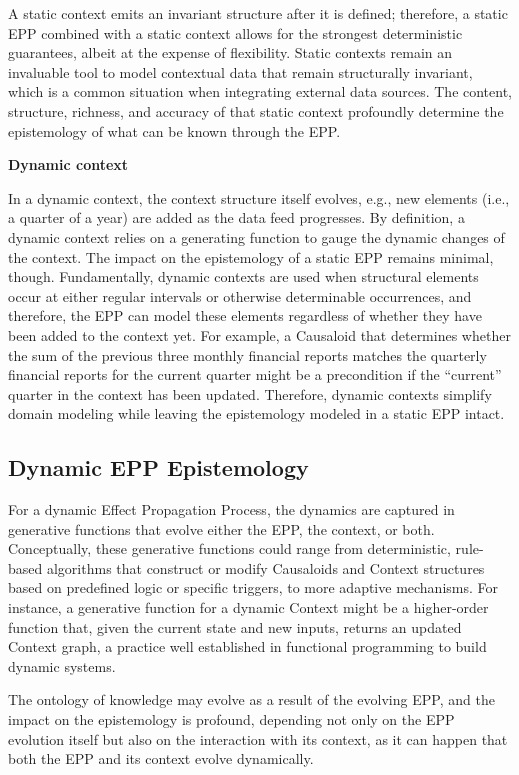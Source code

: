 A static context emits an invariant structure after it is defined; therefore, a static EPP combined with a static context allows for the strongest deterministic guarantees, albeit at the expense of flexibility. Static contexts remain an invaluable tool to model contextual data that remain structurally invariant, which is a common situation when integrating external data sources. The content, structure, richness, and accuracy of that static context profoundly determine the epistemology of what can be known through the EPP.

\textbf{Dynamic context}

In a dynamic context, the context structure itself evolves, e.g., new elements (i.e., a quarter of a year) are added as the data feed progresses. By definition, a dynamic context relies on a generating function to gauge the dynamic changes of the context. The impact on the epistemology of a static EPP remains minimal, though.
Fundamentally, dynamic contexts are used when structural elements occur at either regular intervals or otherwise determinable occurrences, and therefore, the EPP can model these elements regardless of whether they have been added to the context yet.
For example, a Causaloid that determines whether the sum of the previous three monthly financial reports matches the quarterly financial reports for the current quarter might be a precondition if the “current” quarter in the context has been updated. Therefore, dynamic contexts simplify domain modeling while leaving the epistemology modeled in a static EPP intact.

\subsection{Dynamic EPP Epistemology}

For a dynamic Effect Propagation Process, the dynamics are captured in generative functions that evolve either the EPP, the context, or both. Conceptually, these generative functions could range from deterministic, rule-based algorithms that construct or modify Causaloids and Context structures based on predefined logic or specific triggers, to more adaptive mechanisms. For instance, a generative function for a dynamic Context might be a higher-order function that, given the current state and new inputs, returns an updated Context graph, a practice well established in functional programming to build dynamic systems.

The ontology of knowledge may evolve as a result of the evolving EPP, and the impact on the epistemology is profound, depending not only on the EPP evolution itself but also on the interaction with its context, as it can happen that both the EPP and its context evolve dynamically.

